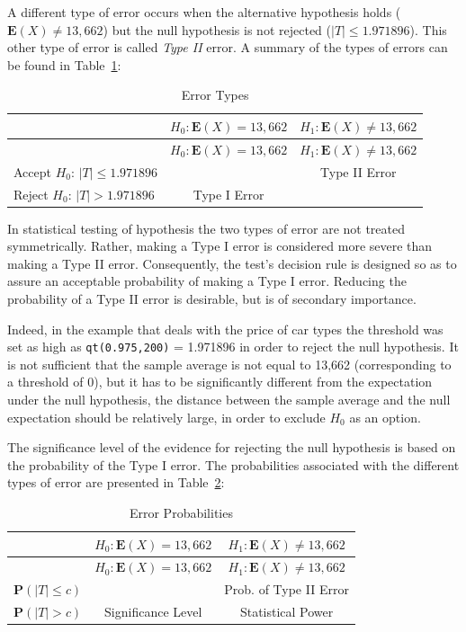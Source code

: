 \documentclass[
]{krantz}
\newcommand{\Expec}{\mathbf{E}}
\newcommand{\Prob}{\mathbf{P}}
\theoremstyle{definition}
\theoremstyle{definition}
\theoremstyle{definition}
\theoremstyle{remark}
\begin{document}
A different type of error occurs when the alternative hypothesis holds
(\(\Expec(X) \not= 13,662\)) but the null hypothesis is not rejected
(\(|T| \leq 1.971896\)). This other type of error is called \emph{Type II}
error. A summary of the types of errors can be found in
Table~\ref{tab:Testing1}:

\begin{longtable}[]{@{}lcc@{}}
\caption{\label{tab:Testing1}Error Types{}}\tabularnewline
\toprule
& \(H_0: \Expec(X) = 13,662\) & \(H_1:\Expec(X) \not= 13,662\)\tabularnewline
\midrule
\endfirsthead
\toprule
& \(H_0: \Expec(X) = 13,662\) & \(H_1:\Expec(X) \not= 13,662\)\tabularnewline
\midrule
\endhead
Accept \(H_0\): \(|T| \leq 1.971896\) & & Type II Error\tabularnewline
Reject \(H_0\): \(|T| > 1.971896\) & Type I Error &\tabularnewline
\bottomrule
\end{longtable}

In statistical testing of hypothesis the two types of error are not
treated symmetrically. Rather, making a Type I error is considered more
severe than making a Type II error. Consequently, the test's decision
rule is designed so as to assure an acceptable probability of making a
Type I error. Reducing the probability of a Type II error is desirable,
but is of secondary importance.

Indeed, in the example that deals with the price of car types the
threshold was set as high as \texttt{qt(0.975,200)} = 1.971896 in order to
reject the null hypothesis. It is not sufficient that the sample average
is not equal to 13,662 (corresponding to a threshold of 0), but it has
to be significantly different from the expectation under the null
hypothesis, the distance between the sample average and the null
expectation should be relatively large, in order to exclude \(H_0\) as an
option.

The significance level of the evidence for rejecting the null hypothesis
is based on the probability of the Type I error. The probabilities
associated with the different types of error are presented in
Table~\ref{tab:Testing2}:

\begin{longtable}[]{@{}lcc@{}}
\caption{\label{tab:Testing2}Error Probabilities{}}\tabularnewline
\toprule
& \(H_0: \Expec(X) = 13,662\) & \(H_1:\Expec(X) \not= 13,662\)\tabularnewline
\midrule
\endfirsthead
\toprule
& \(H_0: \Expec(X) = 13,662\) & \(H_1:\Expec(X) \not= 13,662\)\tabularnewline
\midrule
\endhead
\(\Prob(|T| \leq c)\) & & Prob. of Type II Error\tabularnewline
\(\Prob(|T| > c)\) & Significance Level & Statistical Power\tabularnewline
\bottomrule
\end{longtable}
\end{document}
